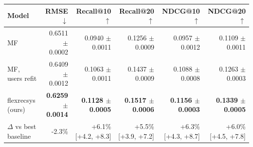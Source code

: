 \begin{tabular}{lrrrrr}
\toprule
Model & RMSE $\downarrow$ & Recall@10 $\uparrow$ & Recall@20 $\uparrow$ & NDCG@10 $\uparrow$ & NDCG@20 $\uparrow$ \\
\midrule
MF & 0.6511 $\pm$ 0.0002 & 0.0940 $\pm$ 0.0011 & 0.1256 $\pm$ 0.0009 & 0.0957 $\pm$ 0.0012 & 0.1109 $\pm$ 0.0011 \\
MF, users refit & 0.6409 $\pm$ 0.0012 & 0.1063 $\pm$ 0.0011 & 0.1437 $\pm$ 0.0009 & 0.1088 $\pm$ 0.0008 & 0.1263 $\pm$ 0.0003 \\
flexrecsys (ours) & \textbf{0.6259 $\pm$ 0.0014} & \textbf{0.1128 $\pm$ 0.0005} & \textbf{0.1517 $\pm$ 0.0006} & \textbf{0.1156 $\pm$ 0.0003} & \textbf{0.1339 $\pm$ 0.0005} \\
\midrule
$\Delta$ vs best baseline & -2.3\% & +6.1\% [+4.2, +8.3] & +5.5\% [+3.9, +7.2] & +6.3\% [+4.3, +8.7] & +6.0\% [+4.5, +7.8] \\
\bottomrule
\end{tabular}
